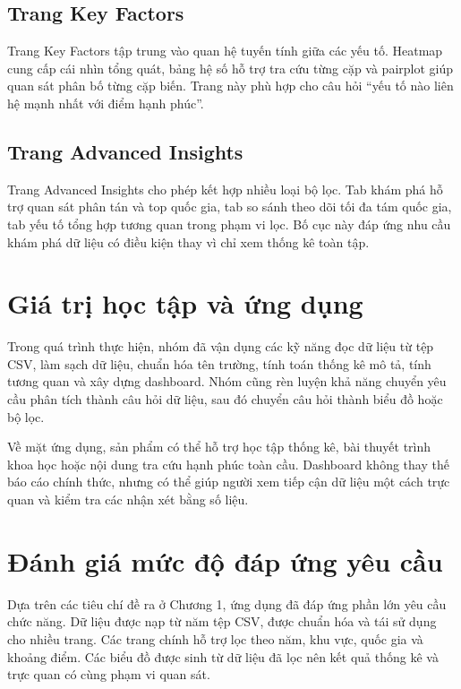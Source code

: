 \subsection{Trang Key Factors}

Trang Key Factors tập trung vào quan hệ tuyến tính giữa các yếu tố. Heatmap cung cấp cái nhìn tổng quát, bảng hệ số hỗ trợ tra cứu từng cặp và pairplot giúp quan sát phân bố từng cặp biến. Trang này phù hợp cho câu hỏi ``yếu tố nào liên hệ mạnh nhất với điểm hạnh phúc''.

\subsection{Trang Advanced Insights}

Trang Advanced Insights cho phép kết hợp nhiều loại bộ lọc. Tab khám phá hỗ trợ quan sát phân tán và top quốc gia, tab so sánh theo dõi tối đa tám quốc gia, tab yếu tố tổng hợp tương quan trong phạm vi lọc. Bố cục này đáp ứng nhu cầu khám phá dữ liệu có điều kiện thay vì chỉ xem thống kê toàn tập.

\section{Giá trị học tập và ứng dụng}

Trong quá trình thực hiện, nhóm đã vận dụng các kỹ năng đọc dữ liệu từ tệp CSV, làm sạch dữ liệu, chuẩn hóa tên trường, tính toán thống kê mô tả, tính tương quan và xây dựng dashboard. Nhóm cũng rèn luyện khả năng chuyển yêu cầu phân tích thành câu hỏi dữ liệu, sau đó chuyển câu hỏi thành biểu đồ hoặc bộ lọc.

Về mặt ứng dụng, sản phẩm có thể hỗ trợ học tập thống kê, bài thuyết trình khoa học hoặc nội dung tra cứu hạnh phúc toàn cầu. Dashboard không thay thế báo cáo chính thức, nhưng có thể giúp người xem tiếp cận dữ liệu một cách trực quan và kiểm tra các nhận xét bằng số liệu.

\section{Đánh giá mức độ đáp ứng yêu cầu}

Dựa trên các tiêu chí đề ra ở Chương 1, ứng dụng đã đáp ứng phần lớn yêu cầu chức năng. Dữ liệu được nạp từ năm tệp CSV, được chuẩn hóa và tái sử dụng cho nhiều trang. Các trang chính hỗ trợ lọc theo năm, khu vực, quốc gia và khoảng điểm. Các biểu đồ được sinh từ dữ liệu đã lọc nên kết quả thống kê và trực quan có cùng phạm vi quan sát.

